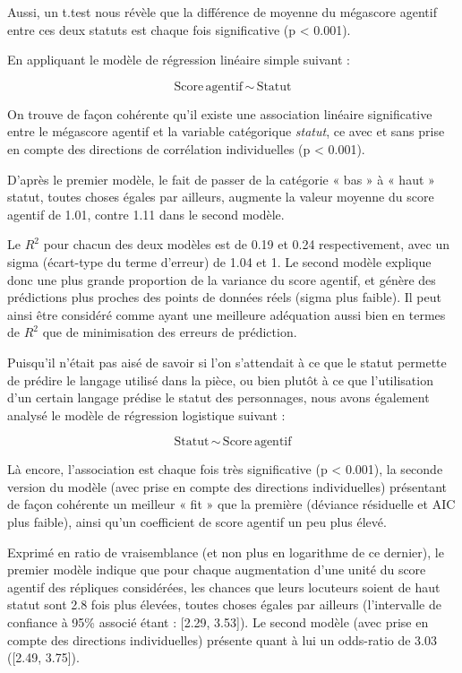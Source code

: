 Aussi, un t.test nous révèle que la différence de moyenne du mégascore agentif entre ces deux statuts est chaque fois significative (p < 0.001). 

En appliquant le modèle de régression linéaire simple suivant : 

\begin{equation}
\text{Score} \, \text{agentif} \, \sim \, \text{Statut}
\end{equation}

On trouve de façon cohérente qu’il existe une association linéaire significative entre le mégascore agentif et la variable catégorique \textit{statut}, ce avec et sans prise en compte des directions de corrélation individuelles (p < 0.001). 

D’après le premier modèle, le fait de passer de la catégorie  « bas » à  « haut » statut, toutes choses égales par ailleurs, augmente la valeur moyenne du score agentif de 1.01, contre 1.11 dans le second modèle.

Le $R^2$ pour chacun des deux modèles est de 0.19 et 0.24 respectivement, avec un sigma (écart-type du terme d’erreur) de 1.04 et 1. Le second modèle explique donc une plus grande proportion de la variance du score agentif, et génère des prédictions plus proches des points de données réels (sigma plus faible). Il peut ainsi être considéré comme ayant une meilleure adéquation aussi bien en termes de $R^2$ que de minimisation des erreurs de prédiction. 

Puisqu’il n’était pas aisé de savoir si l’on s’attendait à ce que le statut permette de prédire le langage utilisé dans la pièce, ou bien plutôt à ce que l’utilisation d’un certain langage prédise le statut des personnages, nous avons également analysé le modèle de régression logistique suivant : 

\begin{equation}
\text{Statut} \, \sim \, \text{Score} \, \text{agentif}
\end{equation}

Là encore, l’association est chaque fois très significative (p < 0.001), la seconde version du modèle (avec prise en compte des directions individuelles) présentant de façon cohérente un meilleur « fit » que la première (déviance résiduelle et AIC plus faible), ainsi qu'un coefficient de score agentif un peu plus élevé. 

Exprimé en ratio de vraisemblance (et non plus en logarithme de ce dernier), le premier modèle indique que pour chaque augmentation d’une unité du score agentif des répliques considérées, les chances que leurs locuteurs soient de haut statut sont 2.8 fois plus élevées, toutes choses égales par ailleurs (l’intervalle de confiance à 95\% associé étant : [2.29, 3.53]). Le second modèle (avec prise en compte des directions individuelles) présente quant à lui un odds-ratio de 3.03 ([2.49, 3.75]).

